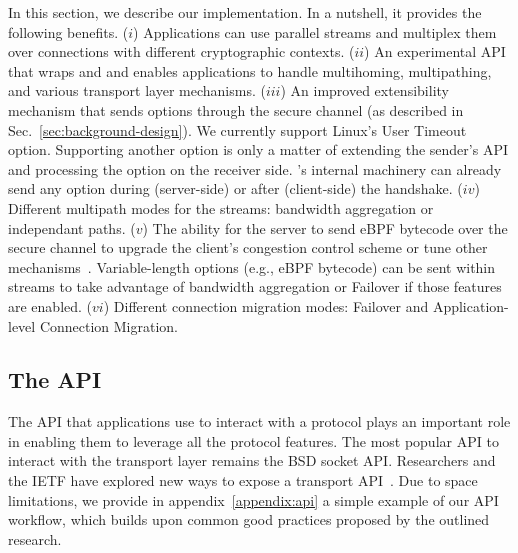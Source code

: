 \label{sec:content}

In this section, we describe our \tcpls implementation. In a nutshell, it provides the following benefits.
($i$) Applications can use parallel streams and multiplex them over \tcp connections with different cryptographic contexts.
($ii$) An experimental API that wraps \tls and \tcp and enables applications to
    handle multihoming, multipathing, and various transport layer mechanisms.
($iii$) An improved \tcp extensibility mechanism that sends \tcp options
   through the secure \tcpls channel (as described in
   Sec.~\ref{sec:background-design}). We currently support Linux's \tcp User Timeout option. Supporting another \tcp option is only a matter of extending the sender's API and processing the option on the receiver side. \tcpls's internal machinery can already send any \tcp option during (server-side) or after (client-side) the \tcp handshake.
($iv$) Different multipath modes for the \tcpls streams: bandwidth aggregation or independant paths.
($v$) The ability for the server to send eBPF bytecode over the secure channel to upgrade the client's \tcp congestion control scheme or tune other \tcp mechanisms~\cite{brakmo2017tcp,tran2019beyond}. Variable-length options (e.g., eBPF bytecode) can be sent within streams to take advantage of bandwidth aggregation or Failover if those features are enabled.
($vi$) Different connection migration modes: Failover and Application-level
Connection Migration.



\subsection{The \tcpls API}

The API that applications use to interact with a protocol plays an important
role in enabling them to leverage all the protocol features. The most popular
API to interact with the transport layer remains the BSD socket API. Researchers
and the IETF have explored new ways to expose a transport
API~\cite{draft-ietf-taps-arch,hruby2014sockets,rfc6458,schmidt2013socket}.
Due to space limitations, we provide in appendix~\ref{appendix:api} a simple example of our API workflow,
which builds upon common good practices proposed by the outlined research.

